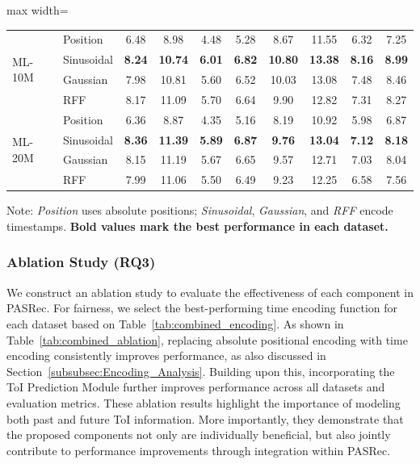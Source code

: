 \documentclass[sigconf,nonacm]{acmart}
\newcommand{\modelname}{PASRec}
\begin{document}
\begin{table}[htbp]
\begin{adjustbox}{max width=\columnwidth}
\begin{tabular}{llcccccccc}
\multirow{4}{*}{ML-10M}
  & Position     & 6.48   & 8.98    & 4.48  & 5.28   & 8.67   & 11.55   & 6.32   & 7.25 \\
  & Sinusoidal   & \textbf{8.24} & \textbf{10.74} & \textbf{6.01} & \textbf{6.82} & \textbf{10.80} & \textbf{13.38} & \textbf{8.16} & \textbf{8.99} \\
  & Gaussian     & 7.98   & 10.81   & 5.60  & 6.52   & 10.03  & 13.08   & 7.48   & 8.46 \\
  & RFF          & 8.17   & 11.09   & 5.70  & 6.64   & 9.90   & 12.82   & 7.31   & 8.27\\
\midrule

\multirow{4}{*}{ML-20M}
  & Position     & 6.36   & 8.87    & 4.35   & 5.16  & 8.19   & 10.92  & 5.98   & 6.87 \\
  & Sinusoidal   & \textbf{8.36} & \textbf{11.39} & \textbf{5.89} & \textbf{6.87} & \textbf{9.76} & \textbf{13.04} & \textbf{7.12} & \textbf{8.18} \\
  & Gaussian     & 8.15   & 11.19  & 5.67   & 6.65 & 9.57   & 12.71  & 7.03  & 8.04 \\
  & RFF          & 7.99   & 11.06  & 5.50   & 6.49 & 9.23   & 12.25  & 6.58  & 7.56 \\
\bottomrule
\end{tabular}
\end{adjustbox}
\footnotesize{Note: \textit{Position} uses absolute positions; \textit{Sinusoidal}, \textit{Gaussian}, and \textit{RFF} encode timestamps. \textbf{Bold values mark the best performance in each dataset.}}
\end{table}


\subsubsection{Ablation Study (RQ3)}
We construct an ablation study to evaluate the effectiveness of each component in \modelname. For fairness, we select the best-performing time encoding function for each dataset based on Table~\ref{tab:combined_encoding}. As shown in Table~\ref{tab:combined_ablation}, replacing absolute positional encoding with time encoding consistently improves performance, as also discussed in Section~\ref{subsubsec:Encoding_Analysis}. Building upon this, incorporating the ToI Prediction Module further improves performance across all datasets and evaluation metrics. These ablation results highlight the importance of modeling both past and future ToI information. More importantly, they demonstrate that the proposed components not only are individually beneficial, but also jointly contribute to performance improvements through integration within \modelname.
\end{document}
